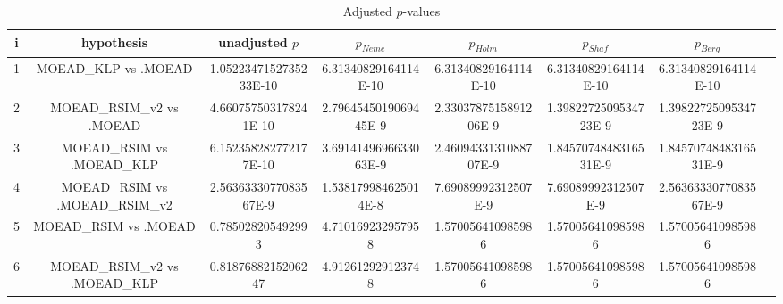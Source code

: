 \documentclass[a4paper,10pt]{article}
\begin{document}
\begin{landscape}
\begin{table}[!htp]
\centering\tiny
\caption{Adjusted $p$-values}
\begin{tabular}{cccccccc}
i&hypothesis&unadjusted $p$&$p_{Neme}$&$p_{Holm}$&$p_{Shaf}$&$p_{Berg}$\\
\hline
1&MOEAD_KLP vs .MOEAD&1.0522347152735233E-10&6.31340829164114E-10&6.31340829164114E-10&6.31340829164114E-10&6.31340829164114E-10\\
2&MOEAD_RSIM_v2 vs .MOEAD&4.660757503178241E-10&2.7964545019069445E-9&2.3303787515891206E-9&1.3982272509534723E-9&1.3982272509534723E-9\\
3&MOEAD_RSIM vs .MOEAD_KLP&6.152358282772177E-10&3.6914149696633063E-9&2.4609433131088707E-9&1.8457074848316531E-9&1.8457074848316531E-9\\
4&MOEAD_RSIM vs .MOEAD_RSIM_v2&2.5636333077083567E-9&1.538179984625014E-8&7.69089992312507E-9&7.69089992312507E-9&2.5636333077083567E-9\\
5&MOEAD_RSIM vs .MOEAD&0.785028205492993&4.710169232957958&1.570056410985986&1.570056410985986&1.570056410985986\\
6&MOEAD_RSIM_v2 vs .MOEAD_KLP&0.8187688215206247&4.912612929123748&1.570056410985986&1.570056410985986&1.570056410985986\\
\hline
\end{tabular}
\end{table}

\end{landscape}
\end{document}
